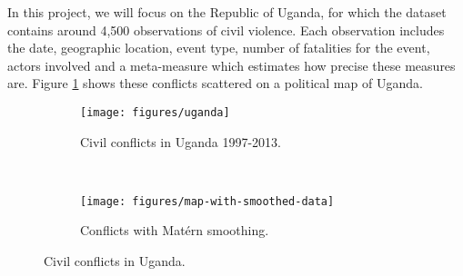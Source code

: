 \documentclass{article} %
\begin{document}
\begin{table}[H]
\caption{The DrivenData Tanzania Dataset}
\centering
{}
\end{table}


In this project, we will focus on the Republic of Uganda, for which the dataset contains around 4,500 observations of civil violence. Each observation includes the date, geographic location, event type, number of fatalities for the event, actors involved and a meta-measure which estimates how precise these measures are. Figure \ref{fig:map-points} shows these conflicts scattered on a political map of Uganda.

\begin{figure}
  \centering
  \begin{subfigure}[b]{0.5\textwidth}
    \centering
    \texttt{[image: figures/uganda]}
    \caption{Civil conflicts in Uganda 1997-2013.}
    \label{fig:map-points}
  \end{subfigure}~\begin{subfigure}[b]{0.5\textwidth}
    \centering
    \texttt{[image: figures/map-with-smoothed-data]}
    \caption{Conflicts with Mat\'{e}rn smoothing.}
    \label{fig:map-smoothed}
  \end{subfigure}
  \caption{Civil conflicts in Uganda.}
  \label{fig:map}
\end{figure}
\end{document}
